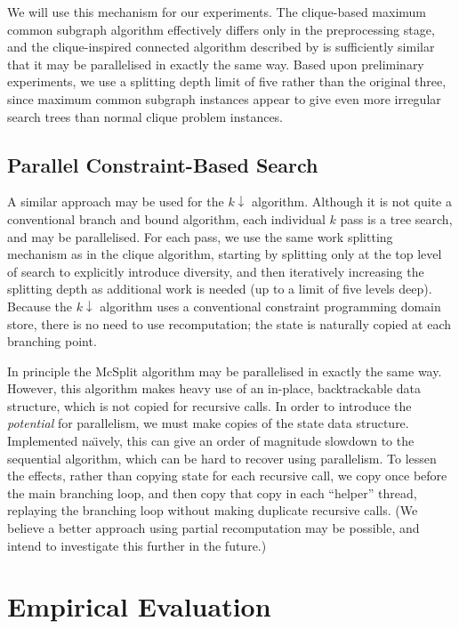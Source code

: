 \documentclass[sigconf]{acmart}
\begin{document}
We will use this mechanism for our experiments.  The clique-based maximum common subgraph algorithm
effectively differs only in the preprocessing stage, and the clique-inspired connected algorithm
described by \citet{DBLP:conf/cp/McCreeshNPS16} is sufficiently similar that it may be parallelised in
exactly the same way. Based upon preliminary experiments, we use a splitting depth limit of five
rather than the original three, since maximum common subgraph instances appear to give even more
irregular search trees than normal clique problem instances.

\subsection{Parallel Constraint-Based Search}

A similar approach may be used for the $k{\downarrow}$ algorithm. Although it is not quite a
conventional branch and bound algorithm, each individual $k$ pass is a tree search, and may be
parallelised. For each pass, we use the same work splitting mechanism as in the clique algorithm,
starting by splitting only at the top level of search to explicitly introduce diversity, and then
iteratively increasing the splitting depth as additional work is needed (up to a limit of five
levels deep).  Because the $k{\downarrow}$ algorithm uses a conventional constraint programming
domain store, there is no need to use recomputation; the state is naturally copied at each branching
point.

In principle the McSplit algorithm may be parallelised in exactly the same way. However, this
algorithm makes heavy use of an in-place, backtrackable data structure, which is not copied for
recursive calls. In order to introduce the \emph{potential} for parallelism, we must make
copies of the state data structure. Implemented na{\"\i}vely, this can give an order of magnitude
slowdown to the sequential algorithm, which can be hard to recover using parallelism. To lessen the
effects, rather than copying state for each recursive call, we copy once before the main branching
loop, and then copy that copy in each ``helper'' thread, replaying the branching loop without making
duplicate recursive calls.  (We believe a better approach using partial recomputation may be
possible, and intend to investigate this further in the future.)

\section{Empirical Evaluation}
\end{document}

